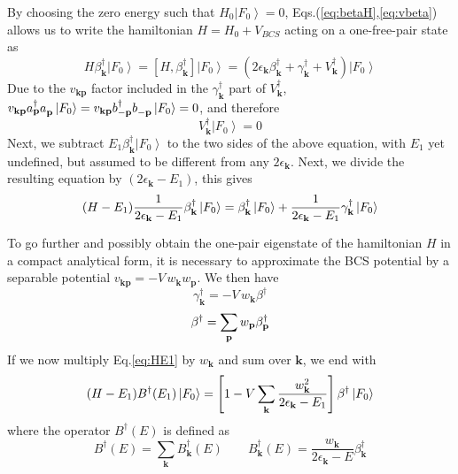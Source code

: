\documentclass[aps,prb,superscriptaddress,showpacs,reprint,lengthcheck]{revtex4-1}
\newcommand{\vk}{\ensuremath{\mathbf{k}}}
\newcommand{\vp}{\ensuremath{\mathbf{p}}}
\begin{document}
By choosing the zero energy such
that $H_0\left|F_0\right> =0$, Eqs.(\ref{eq:betaH},\ref{eq:vbeta}) allows us to write the hamiltonian $H=H_0+V_{BCS}$
acting on a one-free-pair state as 
\begin{equation}
H\beta^{\dagger}_\vk\left|F_0\right>  =\left[H,\beta^{\dagger}_\vk\right] 
\left|F_0\right> 
=\left(2\epsilon_\vk\beta^{\dagger}_\vk+\gamma^{\dagger}_\vk+V^{\dagger}_\vk%
\right) \left|F_0\right>  
\end{equation}
Due to the $v_{\mathbf{k} \mathbf{p} }$ factor included
in the $\gamma^{\dagger}_{\mathbf{k} }$ part of $V^{\dagger}_\vk$, 
 $v_{\mathbf{k} \mathbf{p} }a^{\dagger}_{\mathbf{p} }a^{}_{%
\mathbf{p} }\left|F_0\right>=v_{\mathbf{k} \mathbf{p} }b^{\dagger}_{-\mathbf{p} }b^{}_{-\mathbf{p} }\left|F_0\right>=0$,
and therefore 
\begin{equation}\label{eq:Vk0}
V^{\dagger}_\vk\left|F_0\right> =0
\end{equation}
Next, we subtract $E _1\beta^{\dagger}_\vk\left|F_0\right>  $ to
the two sides of the above equation, with $E_1$ yet undefined, but assumed to be different from any $2\epsilon_{\mathbf{k}}$.  Next, we divide the resulting equation by $%
\left(2\epsilon_\vk-E _1\right) $, this gives
\begin{equation}  \label{eq:HE1}
 (H-E_1)\frac{1}{2\epsilon_\vk-E _1} \beta^{\dagger}_\vk%
\left|F_0\right>  =\beta^{\dagger}_\vk\left|F_0\right>  +\frac{1}{%
2\epsilon_\vk-E _1} \gamma^{\dagger}_\vk\left|F_0\right>  
\end{equation}

To go further and possibly obtain the one-pair eigenstate of the hamiltonian $H$
in a compact analytical form, it is necessary to approximate the BCS potential by a separable potential $v_{\mathbf{k} \mathbf{p} }=-V\,w_\vk{}w_\vp$.
We then have  
\begin{equation}\gamma^{\dagger}_\vk=-V\,w_\vk\beta^{\dagger}
\end{equation} 
\begin{equation}  \label{eq:gammaBeta}
\beta^{\dagger}=\sum_%
\vp{}w_\vp\beta^{\dagger}_\vp
\end{equation}
If we  now multiply Eq.\eqref{eq:HE1} by $w_\vk$ and sum over $\mathbf{k} $,
we end with 
\begin{equation}\label{eq:1pair}
(H-E _1)B^{\dagger}(E _1)\left|F_0\right>  =\left[1-V\sum_\vk{%
\frac{w_\vk^2}{2\epsilon_\vk-E _1}}\right]
\beta^{\dagger}\left|F_0\right>  
\end{equation}
where the operator $B^{\dagger}(E)$ is defined as  
\begin{equation}  \label{eq:B}
B^{\dagger}(E)=\sum_\vk{B_\vk^{\dagger}(E)}\quad\quad B_\vk^{\dagger}(E)=\frac{w_\vk}{2\epsilon_\vk-E}\beta^{\dagger}_\vk
\end{equation}
\end{document}
